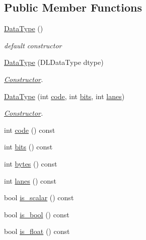 \subsection*{Public Member Functions}
\begin{DoxyCompactItemize}
\item 
\hyperlink{classtvm_1_1runtime_1_1DataType_a6db427a47b8d503b10cd2aee6a39d3a9}{Data\+Type} ()
\begin{DoxyCompactList}\small\item\em default constructor \end{DoxyCompactList}\item 
\hyperlink{classtvm_1_1runtime_1_1DataType_aa27f63a2395ce1ac52e4d7740a31383b}{Data\+Type} (D\+L\+Data\+Type dtype)
\begin{DoxyCompactList}\small\item\em \hyperlink{classtvm_1_1Constructor}{Constructor}. \end{DoxyCompactList}\item 
\hyperlink{classtvm_1_1runtime_1_1DataType_a58d36fef8d6b5fb39b01dccd79ff1db4}{Data\+Type} (int \hyperlink{classtvm_1_1runtime_1_1DataType_a20aec12c682b0e73d3f47ba3b62c418b}{code}, int \hyperlink{classtvm_1_1runtime_1_1DataType_ac26a4b0d3de99a8c08ecc2618a8659d9}{bits}, int \hyperlink{classtvm_1_1runtime_1_1DataType_abc92c7ca9966808f024983c76e12cf4a}{lanes})
\begin{DoxyCompactList}\small\item\em \hyperlink{classtvm_1_1Constructor}{Constructor}. \end{DoxyCompactList}\item 
int \hyperlink{classtvm_1_1runtime_1_1DataType_a20aec12c682b0e73d3f47ba3b62c418b}{code} () const 
\item 
int \hyperlink{classtvm_1_1runtime_1_1DataType_ac26a4b0d3de99a8c08ecc2618a8659d9}{bits} () const 
\item 
int \hyperlink{classtvm_1_1runtime_1_1DataType_acaf924d15f1b2cfef7e27ac5bbb3224e}{bytes} () const 
\item 
int \hyperlink{classtvm_1_1runtime_1_1DataType_abc92c7ca9966808f024983c76e12cf4a}{lanes} () const 
\item 
bool \hyperlink{classtvm_1_1runtime_1_1DataType_aa8e03c0549459bb3a7293f9b1bf04b3e}{is\+\_\+scalar} () const 
\item 
bool \hyperlink{classtvm_1_1runtime_1_1DataType_a805fe49439d48debbc46c071b2957744}{is\+\_\+bool} () const 
\item 
bool \hyperlink{classtvm_1_1runtime_1_1DataType_a4580dc7ac2f703780b0cc249e7d150a2}{is\+\_\+float} () const 

\end{DoxyCompactItemize}
